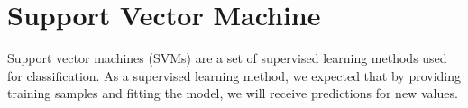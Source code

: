 \chapter{Support Vector Machine}

Support vector machines (SVMs)
are a set of supervised learning methods used for classification.
As a supervised learning method,
we expected that
by providing training samples
and fitting the model,
we will receive predictions for new values.




